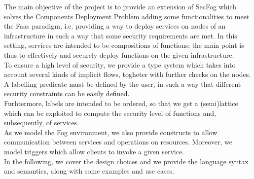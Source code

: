 \documentclass[../DraftNotes.tex]{subfiles}
\begin{document}
The main objective of the project is to provide an extension of SecFog which solves the Components Deployment Problem adding some functionalities to meet the Faas paradigm, i.e. providing a way to deploy services on nodes of an infrastructure in such a way that some security requirements are met. In this setting, services are intended to be compositions of functions: the main point is thus to effectively and securely deploy functions on the given infrastructure. \\
To ensure a high level of security, we provide a type system which takes into account several kinds of implicit flows, togheter with further checks on the nodes. A labelling predicate must be defined by the user, in such a way that different security constraints can be easily defined. \\
Furhtermore, labels are intended to be ordered, so that we get a (semi)lattice which can be exploited to compute the security level of functions and, subsequently, of services. \\
As we model the Fog environment, we also provide constructs to allow communication between services and operations on resources. Moreover, we model triggers which allow clients to invoke a given service. \\
In the following, we cover the design choices and we provide the language syntax and semantics, along with some examples and use cases.
\end{document}
